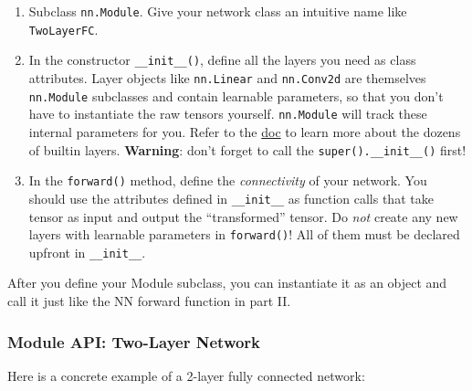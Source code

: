 \documentclass[11pt]{article}
\begin{document}
\begin{enumerate}
\def\labelenumi{\arabic{enumi}.}
\item
  Subclass \texttt{nn.Module}. Give your network class an intuitive name
  like \texttt{TwoLayerFC}.
\item
  In the constructor \texttt{\_\_init\_\_()}, define all the layers you
  need as class attributes. Layer objects like \texttt{nn.Linear} and
  \texttt{nn.Conv2d} are themselves \texttt{nn.Module} subclasses and
  contain learnable parameters, so that you don't have to instantiate
  the raw tensors yourself. \texttt{nn.Module} will track these internal
  parameters for you. Refer to the
  \href{http://pytorch.org/docs/master/nn.html}{doc} to learn more about
  the dozens of builtin layers. \textbf{Warning}: don't forget to call
  the \texttt{super().\_\_init\_\_()} first!
\item
  In the \texttt{forward()} method, define the \emph{connectivity} of
  your network. You should use the attributes defined in
  \texttt{\_\_init\_\_} as function calls that take tensor as input and
  output the ``transformed'' tensor. Do \emph{not} create any new layers
  with learnable parameters in \texttt{forward()}! All of them must be
  declared upfront in \texttt{\_\_init\_\_}.
\end{enumerate}

After you define your Module subclass, you can instantiate it as an
object and call it just like the NN forward function in part II.

\hypertarget{module-api-two-layer-network}{%
\subsubsection{Module API: Two-Layer
Network}\label{module-api-two-layer-network}}

Here is a concrete example of a 2-layer fully connected network:
\end{document}
